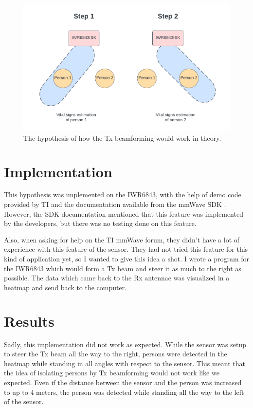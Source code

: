 \begin{figure}[t]
    \centering
    \includegraphics[width=.95\textwidth]{figures/appendix/tx_beamforming_theory2.pdf}
    \caption{The hypothesis of how the Tx beamforming would work in theory.}
    \label{fig:tx_beam_theory}
\end{figure}

\section{Implementation}
This hypothesis was implemented on the IWR6843, with the help of demo code provided by TI and the documentation available from the mmWave SDK \cite{mmwavesdk_website}. However, the SDK documentation mentioned that this feature was implemented by the developers, but there was no testing done on this feature. 

Also, when asking for help on the TI mmWave forum, they didn't have a lot of experience with this feature of the sensor. They had not tried this feature for this kind of application yet, so I wanted to give this idea a shot. I wrote a program for the IWR6843 which would form a Tx beam and steer it as much to the right as possible. The data which came back to the Rx antennae was visualized in a heatmap and send back to the computer.

\section{Results}
Sadly, this implementation did not work as expected. While the sensor was setup to steer the Tx beam all the way to the right, persons were detected in the heatmap while standing in all angles with respect to the sensor. This meant that the idea of isolating persons by Tx beamforming would not work like we expected. Even if the distance between the sensor and the person was increased to up to 4 meters, the person was detected while standing all the way to the left of the sensor. 


